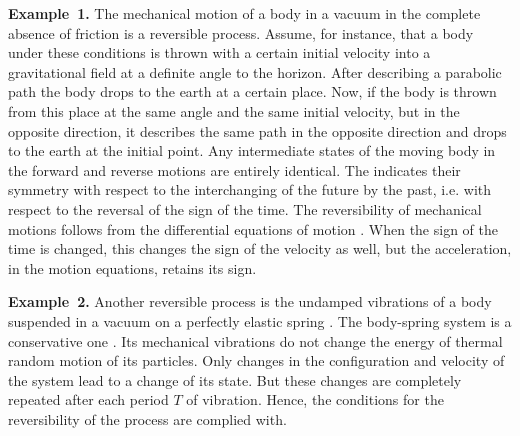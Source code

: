 \textbf{Example~1.} The mechanical motion of a body in a vacuum in the complete absence of friction is a reversible process. Assume, for instance, that a body under these conditions is thrown with a certain initial velocity into a gravitational field  at a definite angle to the horizon. After describing a parabolic path the body drops to the earth at a certain place. Now, if the body is thrown from this place at the same angle and the same initial velocity, but in the opposite direction, it describes the same path in the opposite direction and drops to the earth at the initial point. Any intermediate states of the moving body in the forward and reverse motions are entirely identical. The  indicates their symmetry with respect to the interchanging of the future by the past, i.e. with respect to the reversal of the sign of the time. The re­versibility of mechanical motions follows from the differential equations of motion . When the sign of the time is changed, this changes the sign of the velocity as well, but the acceleration, in the motion equations, retains its sign. 

\textbf{Example~2.} Another reversible process is the undamped vibrations of a body suspended in a vacuum on a perfectly elastic spring . The body-spring system is a conservative one . Its mechanical vibrations do not change the energy of thermal random motion of its particles. Only changes in the configuration and velocity of the system lead to a change of its state. But these changes are completely repeated after each period $T$  of vibration. Hence, the conditions for the
reversibility  of the process are complied with.

